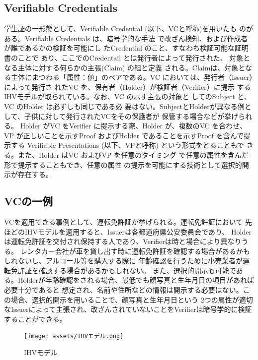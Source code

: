 \documentclass[10pt]{ltjsarticle}
\begin{document}
\subsection{Verifiable Credentials}
学生証の一形態として、Verifiable Credential (以下、VCと呼称)を用いたも
のがある。Verifiable Credentials は、暗号学的な手法
で改ざん検知、および作成者が誰であるかの検証を可能にし
たCredential のこと、すなわち検証可能な証明書のことで
あり、ここでのCredentail とは発行者によって発行された、
対象となる主体に対する何らかの主張(Claim) の組と定義
される。Claimは、対象となる主体にまつわる「属性：値」のペアである。VC においては、発行者（Issuer）によって発行さ
れたVC を、保有者（Holder）が検証者（Verifier）に提示
するIHVモデルが取られている。なお、VC の示す主張の対象と
してのSubject と、VC のHolder は必ずしも同じである必
要はない。SubjectとHolderが異なる例として、子供に対して発行されたVCをその保護者が
保管する場合などが挙げられる。
Holder がVC をVerifier に提示する際、Holder
が、複数のVC を合わせ、VP が正しいことを示すProof
およびHolder であることを示すProof を含んで提示する
Verifiable Presentations (以下、VPと呼称) という形式をとることもで
きる。また、Holder はVC およびVP を任意のタイミング
で任意の属性を含んだ形で提示することもでき、任意の属性
の提示を可能にする技術として選択的開示が存在する。

\subsection{VCの一例}
VCを適用できる事例として、運転免許証が挙げられる。運転免許証において
先ほどのIHVモデルを適用すると、Issuerは各都道府県公安委員会であり、
Holderは運転免許証を交付され保持する人であり、Verifierは時と場合により異なりうる。
レンタカー会社が車を貸し出す時に運転免許証を確認する場合があるかもしれないし、アルコール等を購入する際に
年齢確認を行うために小売業者が運転免許証を確認する場合があるかもしれない。
また、選択的開示も可能である。Holderが年齢確認をされる場合、最低でも顔写真と生年月日の項目があれば必要十分であると
想定され、名前や住所などの情報は開示する必要はない。この場合、選択的開示を用いることで、顔写真と生年月日という
2つの属性が適切なIssuerによって主張され、改ざんされていないことをVerifierは暗号学的に検証することができる。

\begin{figure}[htbp]
    \begin{center}
        \texttt{[image: assets/IHVモデル.png]}
        \caption{IHVモデル}
    \end{center}
\end{figure}
\end{document}
